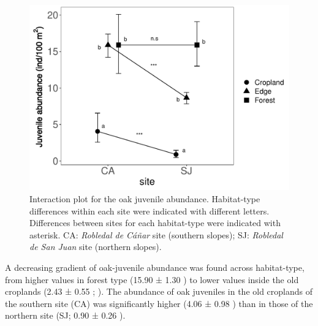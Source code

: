 \begin{table}[]
\caption{Model selection for the oak juvenile abundance, sorted by minimum AICc value.}
\label{tab:coloniza:modelselection}
\end{table}

\begin{figure}
    \centering
    \includegraphics[width=\textwidth,height=8cm,
  keepaspectratio]{img/coloniza/coloniza-juvenile-interaction.pdf}
    \caption{Interaction plot for the oak juvenile abundance. Habitat-type differences within each site were indicated with different letters. Differences between sites for each habitat-type were indicated with asterisk. CA: \emph{Robledal de Cáñar} site (southern slopes); SJ: \emph{Robledal de San Juan} site (northern slopes).}
    \label{fig:coloniza:interaction}
\end{figure}

A decreasing gradient of oak-juvenile abundance was found across habitat-type, from higher values in forest type (15.90 ± 1.30 \juv) to lower values inside the old croplands (2.43 ± 0.55 \juv; ). The abundance of oak juveniles in the old croplands of the southern site (CA) was significantly higher (4.06 ± 0.98 \juv) than in those of the northern site (SJ; 0.90 ± 0.26 \juv). 

